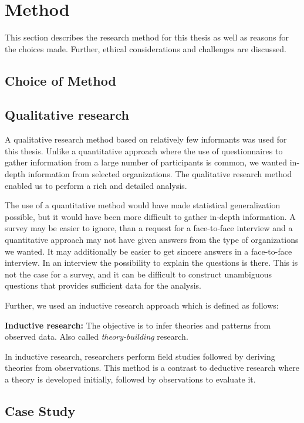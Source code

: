 \chapter{Method}
\label{chp:method}
This section describes the research method for this thesis as well as reasons for the choices made. Further, ethical considerations and challenges are discussed.
\section{Choice of Method}


\section{Qualitative research}
\label{sec:qualitativeresearch}
A qualitative research method based on relatively few informants was used for this thesis. Unlike a quantitative approach where the use of questionnaires to gather information from a large number of participants is common, we wanted in-depth information from selected organizations. The qualitative research method enabled us to perform a rich and detailed analysis. 

The use of a quantitative method would have made statistical generalization possible, but it would have been more difficult to gather in-depth information. A survey may be easier to ignore, than a request for a face-to-face interview and a quantitative approach may not have given answers from the type of organizations we wanted. It may additionally be easier to get sincere answers in a face-to-face interview. In an interview the possibility to explain the questions is there. This is not the case for a survey, and it can be difficult to construct unambiguous questions that provides sufficient data for the analysis.

\pagebreak
Further, we used an inductive research approach which is defined as follows\cite{bhattacherjee2012social}: 

\textbf{Inductive research:} The objective is to infer theories and patterns from observed data. Also called \emph{theory-building} research.

In inductive research, researchers perform field studies followed by deriving theories from observations. This method is a contrast to deductive research where a theory is developed initially, followed by observations to evaluate it\cite{oates2005researching}.

\section{Case Study}
\label{sec:caseStudy}


